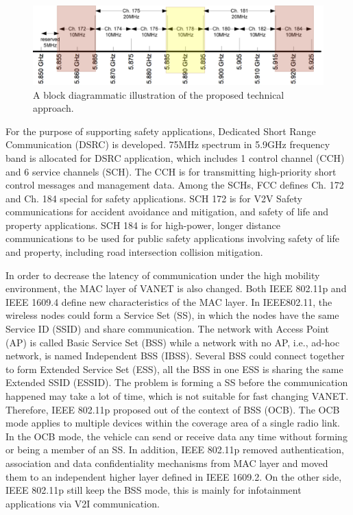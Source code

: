 \begin{figure}[h!]
	\centering
	\includegraphics[width=0.7\columnwidth]{figures/DSRC_channel.png}
	\caption{A block diagrammatic illustration of the proposed technical approach.}
	\label{fig-project-block}
\end{figure}


For the purpose of supporting safety applications, Dedicated Short Range Communication (DSRC) is developed. 75MHz spectrum in 5.9GHz frequency band is allocated for DSRC application, which includes 1 control channel (CCH) and 6 service channels (SCH). The CCH is for transmitting high-priority short control messages and management data. Among the SCHs, FCC defines Ch. 172 and Ch. 184 special for safety applications.  SCH 172 is for V2V Safety communications for accident avoidance and mitigation, and safety of life and property applications. SCH 184 is for high-power, longer distance communications to be used for public safety applications involving safety of life and property, including road intersection collision mitigation. 

In order to decrease the latency of communication under the high mobility environment, the MAC layer of VANET is also changed. Both IEEE 802.11p and IEEE 1609.4 define new characteristics of the MAC layer. In IEEE802.11, the wireless nodes could form a Service Set (SS), in which the nodes have the same Service ID (SSID) and share communication. The network with Access Point (AP) is called Basic Service Set (BSS) while a network with no AP, i.e., ad-hoc network, is named Independent BSS (IBSS). Several BSS could connect together to form Extended Service Set (ESS), all the BSS in one ESS is sharing the same Extended SSID (ESSID). The problem is forming a SS before the communication happened may take a lot of time, which is not suitable for fast changing VANET. Therefore, IEEE 802.11p proposed out of the context of BSS (OCB). The OCB mode applies to multiple devices within the coverage area of a single radio link. In the OCB mode, the vehicle can send or receive data any time without forming or being a member of an SS. In addition, IEEE 802.11p removed authentication, association and data confidentiality mechanisms from MAC layer and moved them to an independent higher layer defined in IEEE 1609.2. On the other side, IEEE 802.11p still keep the BSS mode, this is mainly for infotainment applications via V2I communication. 

